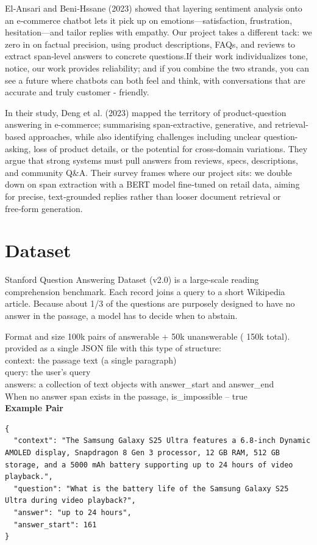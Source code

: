 \documentclass[10pt,conference]{IEEEtran}
\begin{document}
El‑Ansari and Beni‑Hssane (2023) \cite{2} showed that layering sentiment analysis onto an e‑commerce chatbot lets it pick up on emotions—satisfaction, frustration, hesitation—and tailor replies with empathy. Our project takes a different tack: we zero in on factual precision, using product descriptions, FAQs, and reviews to extract span‑level answers to concrete questions.If their work individualizes tone, notice, our work provides reliability; and if you combine the two strands, you can see a future where chatbots can both feel and think, with conversations that are accurate and truly customer - friendly.

In their study, Deng et al. (2023) \cite{3} mapped the territory of product-question answering in e-commerce; summarising span-extractive, generative, and retrieval-based approaches, while also identifying challenges including unclear question-asking, loss of product details, or the potential for cross-domain variations. They argue that strong systems must pull answers from reviews, specs, descriptions, and community Q\&A. Their survey frames where our project sits: we double down on span extraction with a BERT model fine‑tuned on retail data, aiming for precise, text‑grounded replies rather than looser document retrieval or free‑form generation.
\section{\textbf{Dataset}}

Stanford Question Answering Dataset (v2.0) is a large-scale reading comprehension benchmark. Each record joins a query to a short Wikipedia article. Because about 1/3 of the questions are purposely designed to have no answer in the passage, a model has to decide when to abstain.

Format and size 100k pairs of answerable + 50k unanswerable ( 150k total).
provided as a single JSON file with this type of structure: \\
context: the passage text (a single paragraph) \\
query: the user's query \\
answers: a collection of text objects with answer\_start and answer\_end \\
When no answer span exists in the passage, is\_impossible – true \\

\textbf{Example Pair}

\begin{minipage}{0.45\textwidth}
\lstset{basicstyle=\ttfamily\small,breaklines=true}
\begin{lstlisting}
{
  "context": "The Samsung Galaxy S25 Ultra features a 6.8-inch Dynamic AMOLED display, Snapdragon 8 Gen 3 processor, 12 GB RAM, 512 GB storage, and a 5000 mAh battery supporting up to 24 hours of video playback.",
  "question": "What is the battery life of the Samsung Galaxy S25 Ultra during video playback?",
  "answer": "up to 24 hours",
  "answer_start": 161
}
\end{lstlisting}
\end{minipage}
\end{document}
